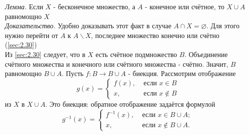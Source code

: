 \documentclass[a4paper]{article}
\begin{document}
\textit{Лемма.} Если $X$ - бесконечное множество, а $A$ - конечное или счётное, то $X \cup A$ равномощно $X$\\[2mm]
\textit{Доказательство.} Удобно доказывать этот факт в случае $A \cap X=\varnothing$. Для этого нужно перейти от $A$ к $A \backslash X$, последнее множество конечно или счётно (\ref{sec:2.30})\\[2mm]
\indent Из \ref{sec:2.30} следует, что в $X$ есть счётное подмножество $B$. Объединение счётного множества и конечного или счётного множества - счётно. Значит, $B$ равномощно $B \cup A$. Пусть $f: B \rightarrow B \cup A$ - биекция. Рассмотрим отображение
$$
g(x)= \begin{cases}f(x), & \text { если } x \in B \\ x, & \text { если } x \notin B\end{cases}
$$
из $X$ в $X \cup A$. Это биекция: обратное отображение задаётся формулой
$$
g^{-1}(x)= \begin{cases}f^{-1}(x), & \text { если } x \in B \cup A ; \\ x, & \text { если } x \notin B \cup A .\end{cases}
$$\label{sec:2.31}
\end{document}
